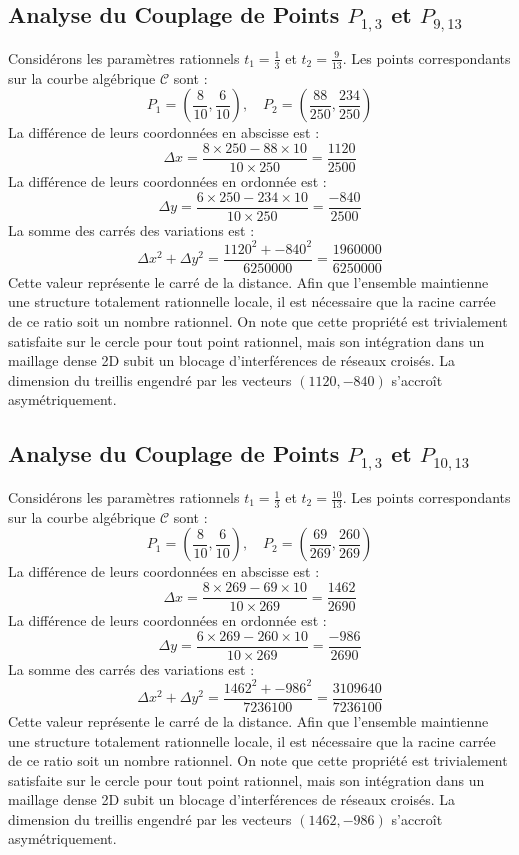 \documentclass[12pt, a4paper]{article}
\begin{document}
\subsection{Analyse du Couplage de Points $P_{1,3}$ et $P_{9,13}$}
Considérons les paramètres rationnels $t_1 = \frac{1}{3}$ et $t_2 = \frac{9}{13}$.
Les points correspondants sur la courbe algébrique $\mathcal{C}$ sont :
$$ P_1 = \left( \frac{8}{10}, \frac{6}{10} \right), \quad P_2 = \left( \frac{88}{250}, \frac{234}{250} \right) $$
La différence de leurs coordonnées en abscisse est :
$$ \Delta x = \frac{8 \times 250 - 88 \times 10}{10 \times 250} = \frac{1120}{2500} $$
La différence de leurs coordonnées en ordonnée est :
$$ \Delta y = \frac{6 \times 250 - 234 \times 10}{10 \times 250} = \frac{-840}{2500} $$
La somme des carrés des variations est :
$$ \Delta x^2 + \Delta y^2 = \frac{ 1120^2 + -840^2 }{ 6250000 } = \frac{ 1960000 }{ 6250000 } $$
Cette valeur représente le carré de la distance. Afin que l'ensemble maintienne une structure totalement rationnelle locale, il est nécessaire que la racine carrée de ce ratio soit un nombre rationnel. On note que cette propriété est trivialement satisfaite sur le cercle pour tout point rationnel, mais son intégration dans un maillage dense 2D subit un blocage d'interférences de réseaux croisés. La dimension du treillis engendré par les vecteurs $( 1120, -840 )$ s'accroît asymétriquement.


\subsection{Analyse du Couplage de Points $P_{1,3}$ et $P_{10,13}$}
Considérons les paramètres rationnels $t_1 = \frac{1}{3}$ et $t_2 = \frac{10}{13}$.
Les points correspondants sur la courbe algébrique $\mathcal{C}$ sont :
$$ P_1 = \left( \frac{8}{10}, \frac{6}{10} \right), \quad P_2 = \left( \frac{69}{269}, \frac{260}{269} \right) $$
La différence de leurs coordonnées en abscisse est :
$$ \Delta x = \frac{8 \times 269 - 69 \times 10}{10 \times 269} = \frac{1462}{2690} $$
La différence de leurs coordonnées en ordonnée est :
$$ \Delta y = \frac{6 \times 269 - 260 \times 10}{10 \times 269} = \frac{-986}{2690} $$
La somme des carrés des variations est :
$$ \Delta x^2 + \Delta y^2 = \frac{ 1462^2 + -986^2 }{ 7236100 } = \frac{ 3109640 }{ 7236100 } $$
Cette valeur représente le carré de la distance. Afin que l'ensemble maintienne une structure totalement rationnelle locale, il est nécessaire que la racine carrée de ce ratio soit un nombre rationnel. On note que cette propriété est trivialement satisfaite sur le cercle pour tout point rationnel, mais son intégration dans un maillage dense 2D subit un blocage d'interférences de réseaux croisés. La dimension du treillis engendré par les vecteurs $( 1462, -986 )$ s'accroît asymétriquement.
\end{document}
